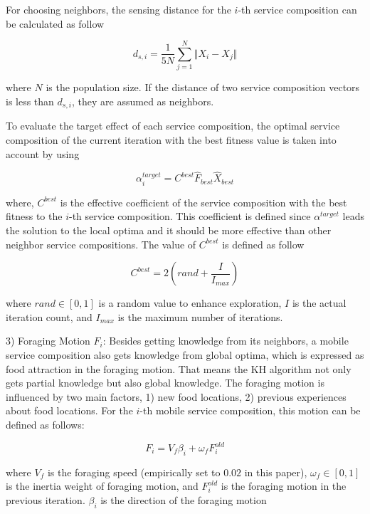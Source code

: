 For choosing neighbors, the sensing distance for the $i$-th service composition can be calculated as follow

\begin{equation}
d_{s,i} = \frac{1}{5N}\sum_{j=1}^{N}\Vert X_i-X_j \Vert
\end{equation}

where $N$ is the population size. If the distance of two service composition vectors is less than $d_{s,i}$, they are assumed as neighbors.

​To evaluate the target effect of each service composition, the optimal service composition of the current iteration with the best fitness value is taken into account by using

\begin{equation}
\alpha^{target}_{i} = C^{best}\hat{F}_{best}\hat{X}_{best}
\end{equation}

where, $C^{best}$ is the effective coefficient of the service composition with the best fitness to the $i$-th service composition. This coefficient is defined since $\alpha^{target}$ leads the solution to the local optima and it should be more effective than other neighbor service compositions. The value of $C^{best}$ is defined as follow

\begin{equation}
C^{best} = 2(rand+\frac{I}{I_{max}})
\end{equation}

where $rand \in [0, 1]$ is a random value to enhance exploration, $I$ is the actual iteration count, and $I_{max}$ is the maximum number of iterations.

3) Foraging Motion $F_i$: Besides getting knowledge from its neighbors, a mobile service composition also gets knowledge from global optima, which is expressed as food attraction in the foraging motion. That means the KH algorithm not only gets partial knowledge but also global knowledge. The foraging motion is influenced by two main factors, 1) new food locations, 2) previous experiences about food locations. For the $i$-th mobile service composition, this motion can be defined as follows:

\begin{equation}
F_i = V_f\beta_i + \omega_f F^{old}_i
\end{equation}

where $V_f$ is the foraging speed (empirically set to $0.02$ in this paper), $\omega_f∈ [0, 1]$ is the inertia weight of foraging motion, and $F^{old}_i$ is the foraging motion in the previous iteration. $\beta_i$ is the direction of the foraging motion

